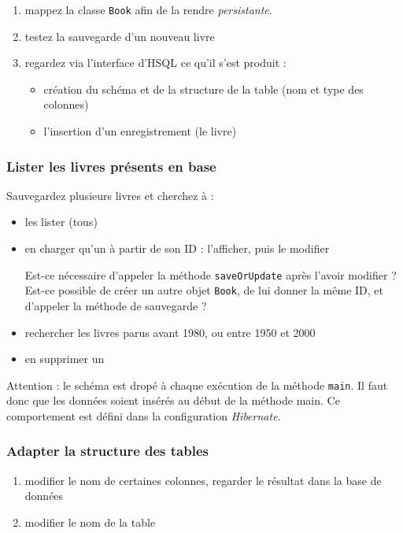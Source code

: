 \documentclass[small,algo]{dushClass} %
\begin{document}
\begin{enumerate}
\item mappez la classe \texttt{Book} afin de la rendre \emph{persistante}.
\item testez la sauvegarde d'un nouveau livre
\item regardez via l'interface d'HSQL ce qu'il s'est produit :
\begin{itemize}
\item création du schéma et de la structure de la table (nom et type des colonnes)
\item l'insertion d'un enregistrement (le livre)
\end{itemize}
\end{enumerate}

\subsubsection{Lister les livres présents en base}

Sauvegardez plusieurs livres et cherchez à :
\begin{itemize}
\item les lister (tous)
\item en charger qu'un à partir de son ID : l'afficher, puis le modifier\par
Est-ce nécessaire d'appeler la méthode \texttt{saveOrUpdate} après l'avoir modifier ? Est-ce possible de créer un autre objet \texttt{Book}, de lui donner la même ID, et d'appeler la méthode de sauvegarde ?
\item rechercher les livres parus avant 1980, ou entre 1950 et 2000
\item en supprimer un\\
\end{itemize}

Attention : le schéma est dropé à chaque exécution de la méthode \texttt{main}. Il faut donc que les données soient insérés au début de la méthode main. Ce comportement est défini dans la configuration \emph{Hibernate}.
\subsubsection{Adapter la structure des tables}

\begin{enumerate}
\item modifier le nom de certaines colonnes, regarder le résultat dans la base de données
\item modifier le nom de la table
\end{enumerate}
\end{document}
